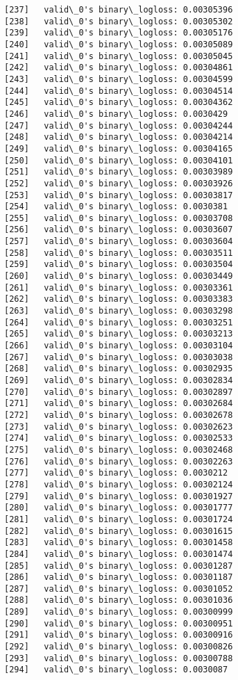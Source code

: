 \documentclass[11pt]{article}
\begin{document}
\begin{Verbatim}[commandchars=\\\{\}]
[237]	valid\_0's binary\_logloss: 0.00305396
[238]	valid\_0's binary\_logloss: 0.00305302
[239]	valid\_0's binary\_logloss: 0.00305176
[240]	valid\_0's binary\_logloss: 0.00305089
[241]	valid\_0's binary\_logloss: 0.00305045
[242]	valid\_0's binary\_logloss: 0.00304861
[243]	valid\_0's binary\_logloss: 0.00304599
[244]	valid\_0's binary\_logloss: 0.00304514
[245]	valid\_0's binary\_logloss: 0.00304362
[246]	valid\_0's binary\_logloss: 0.0030429
[247]	valid\_0's binary\_logloss: 0.00304244
[248]	valid\_0's binary\_logloss: 0.00304214
[249]	valid\_0's binary\_logloss: 0.00304165
[250]	valid\_0's binary\_logloss: 0.00304101
[251]	valid\_0's binary\_logloss: 0.00303989
[252]	valid\_0's binary\_logloss: 0.00303926
[253]	valid\_0's binary\_logloss: 0.00303817
[254]	valid\_0's binary\_logloss: 0.0030381
[255]	valid\_0's binary\_logloss: 0.00303708
[256]	valid\_0's binary\_logloss: 0.00303607
[257]	valid\_0's binary\_logloss: 0.00303604
[258]	valid\_0's binary\_logloss: 0.00303511
[259]	valid\_0's binary\_logloss: 0.00303504
[260]	valid\_0's binary\_logloss: 0.00303449
[261]	valid\_0's binary\_logloss: 0.00303361
[262]	valid\_0's binary\_logloss: 0.00303383
[263]	valid\_0's binary\_logloss: 0.00303298
[264]	valid\_0's binary\_logloss: 0.00303251
[265]	valid\_0's binary\_logloss: 0.00303213
[266]	valid\_0's binary\_logloss: 0.00303104
[267]	valid\_0's binary\_logloss: 0.00303038
[268]	valid\_0's binary\_logloss: 0.00302935
[269]	valid\_0's binary\_logloss: 0.00302834
[270]	valid\_0's binary\_logloss: 0.00302897
[271]	valid\_0's binary\_logloss: 0.00302684
[272]	valid\_0's binary\_logloss: 0.00302678
[273]	valid\_0's binary\_logloss: 0.00302623
[274]	valid\_0's binary\_logloss: 0.00302533
[275]	valid\_0's binary\_logloss: 0.00302468
[276]	valid\_0's binary\_logloss: 0.00302263
[277]	valid\_0's binary\_logloss: 0.0030212
[278]	valid\_0's binary\_logloss: 0.00302124
[279]	valid\_0's binary\_logloss: 0.00301927
[280]	valid\_0's binary\_logloss: 0.00301777
[281]	valid\_0's binary\_logloss: 0.00301724
[282]	valid\_0's binary\_logloss: 0.00301615
[283]	valid\_0's binary\_logloss: 0.00301458
[284]	valid\_0's binary\_logloss: 0.00301474
[285]	valid\_0's binary\_logloss: 0.00301287
[286]	valid\_0's binary\_logloss: 0.00301187
[287]	valid\_0's binary\_logloss: 0.00301052
[288]	valid\_0's binary\_logloss: 0.00301036
[289]	valid\_0's binary\_logloss: 0.00300999
[290]	valid\_0's binary\_logloss: 0.00300951
[291]	valid\_0's binary\_logloss: 0.00300916
[292]	valid\_0's binary\_logloss: 0.00300826
[293]	valid\_0's binary\_logloss: 0.00300788
[294]	valid\_0's binary\_logloss: 0.0030087

\end{Verbatim}
\end{document}
